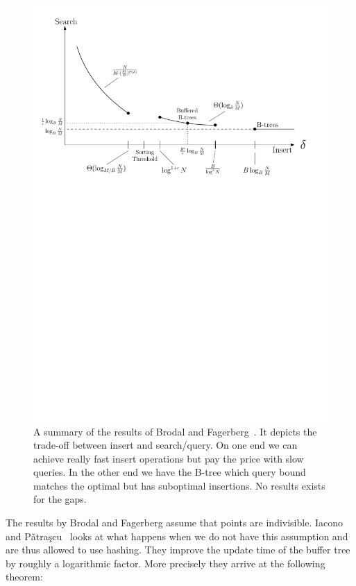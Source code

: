 \documentclass[twoside,11pt,openright]{report}
\begin{document}
\begin{figure}
\centering
\includegraphics[width=\textwidth]{../figures/lower_bound_summary}
\caption{A summary of the results of Brodal and Fagerberg~\cite{Brodal:2003:LBE:644108.644201}. It depicts the trade-off between insert and search/query. On one end we can achieve really fast insert operations but pay the price with slow queries. In the other end we have the B-tree which query bound matches the optimal but has suboptimal insertions. No results exists for the gaps.}
\label{fig:lower_bound_summary}
\end{figure}

The results by Brodal and Fagerberg assume that points are indivisible. Iacono and P\v{a}tra\c{s}cu~\cite{Iacono:2012:UHS:2095116.2095164} looks at what happens when we do not have this assumption and are thus allowed to use hashing. They improve the update time of the buffer tree by roughly a logarithmic factor. More precisely they arrive at the following theorem:
\end{document}

